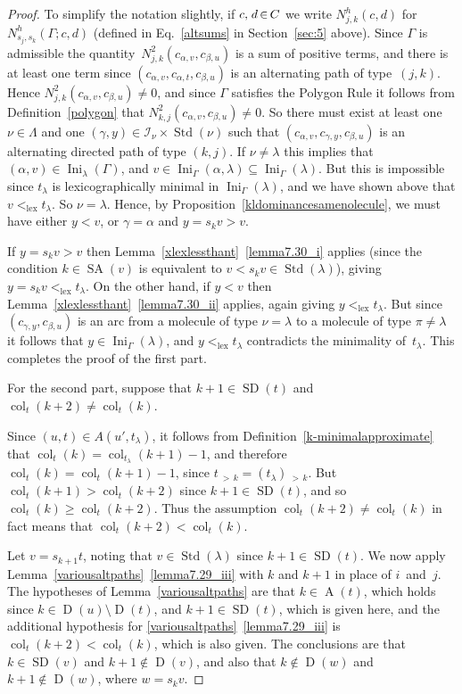 \documentclass[ALCO,ThmDefs,Unicode,epreuves]{cedram}
\DeclareMathOperator{\Ini}{Ini}
\DeclareMathOperator{\lex}{lex}
\DeclareMathOperator{\col}{col}
\newcommand{\morethan}[2]{#1\,{_{>\,#2}}}
\DeclareMathOperator{\STD}{Std}
\DeclareMathOperator{\SD}{SD}
\DeclareMathOperator{\SA}{SA}
\DeclareMathOperator{\D}{D}
\DeclareMathOperator{\A}{A}
\newcommand*{\mk}{\mkern -1mu}
\newcommand*{\Mk}{\mkern -2mu}
\begin{document}
\begin{proof}
To simplify the notation slightly, if $c,\,\mk d \Mk \in \Mk C$ we write
$N^h_{j,k}(c,d)$ for $N^h_{s_j,s_k}(\Gamma;c,d)$ (de\-fined in Eq.~\eqref{altsums}
in Section~\ref{sec:5} above). Since $\Gamma$ is admissible the quantity~$N^{2}_{j,k}(c_{\alpha,v},c_{\beta,u})$ is a sum of positive terms, and there
is at least one term since $(c_{\alpha,v},c_{\alpha,t},c_{\beta,u})$ is an
alternating path of type~$(j,k)$. Hence
$N^{2}_{j,k}(c_{\alpha,v},c_{\beta,u})\ne0$, and since $\Gamma$ satisfies
the Polygon Rule it follows from Definition~\ref{polygon} that
$N^{2}_{k,j}(c_{\alpha,v},c_{\beta,u})\ne0$. So there must exist at least
one $\nu\in\Lambda$ and one
$(\gamma,y)\in\mathcal{I}_{\nu}\times\STD(\nu)$
such that $(c_{\alpha,v},c_{\gamma,y},c_{\beta,u})$ is an alternating directed
path of type $(k,j)$. If $\nu\ne\lambda$ this implies that
$(\alpha,v)\in\Ini_\lambda(\Gamma)$, and
$v\in\Ini_\Gamma(\alpha,\lambda)\subseteq\Ini_\Gamma(\lambda)$.
But this is impossible since $t_\lambda$ is lexicographically minimal
in $\Ini_\Gamma(\lambda)$, and we have shown above that $v<_{\lex}t_\lambda$.
So $\nu=\lambda$. Hence, by Proposition~\ref{kldominancesamenolecule}, we must
have either $y<v$, or $\gamma=\alpha$ and $y=s_kv>v$.

If $y=s_kv>v$ then Lemma~\ref{xlexlessthant}~\ref{lemma7.30_i} applies (since the condition
$k\in\SA(v)$ is equivalent to $v<s_kv\in\STD(\lambda)$),
giving $y=s_kv <_{\lex}t_\lambda$. On the other hand, if $y<v$ then
Lemma~\ref{xlexlessthant}~\ref{lemma7.30_ii} applies, again giving $y<_{\lex}t_\lambda$.
But since $(c_{\gamma,y},c_{\beta,u})$ is an arc from a molecule of type $\nu=\lambda$
to a molecule of type $\pi\ne\lambda$ it follows that
$y\in\Ini_\Gamma(\lambda)$, and $y<_{\lex}t_\lambda$ contradicts the
minimality of~$t_\lambda$. This completes
the proof of the first part.

For the second part, suppose that $k+1\in\SD(t)$ and
$\col_t(k+2)\neq\col_t(k)$.

Since $(u,t)\in A(u',t_\lambda)$, it follows from Definition~\ref{k-minimalapproximate}
that $\col_t(k)=\col_{t_\lambda}(k+1)-1$, and therefore
$\col_t(k)=\col_t(k+1)-1$, since $\morethan tk=\morethan{(t_\lambda)}k$.
But $\col_t(k+1)>\col_t(k+2)$ since $k+1\in\SD(t)$, and so
$\col_t(k)\geqslant\col_t(k+2)$. Thus the assumption $\col_t(k+2)\neq\col_t(k)$
in fact means that $\col_t(k+2)<\col_t(k)$.

Let $v=s_{k+1}t$, noting that $v\in\STD(\lambda)$ since $k+1\in\SD(t)$.
We now apply Lemma~\ref{variousaltpaths}~\ref{lemma7.29_iii} with $k$ and $k+1$ in place
of $i$~and~$j$. The hypotheses of Lemma~\ref{variousaltpaths} are that
$k\in\A(t)$, which holds since $k\in\D(u)\setminus\D(t)$, and
$k+1\in\SD(t)$, which is given here, and the additional hypothesis
for \ref{variousaltpaths}~\ref{lemma7.29_iii} is $\col_t(k+2)<\col_t(k)$, which is
also given. The conclusions are that $k\in\SD(v)$ and $k+1\notin\D(v)$,
and also that $k\notin\D(w)$ and $k+1\notin\D(w)$, where $w=s_kv$.


\end{proof}
\end{document}
